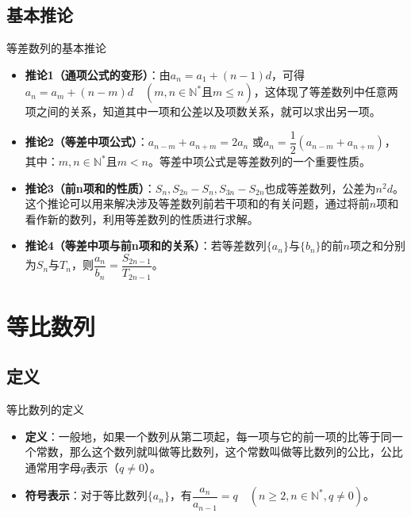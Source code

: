 \documentclass[aspectratio=169]{ctexbeamer} %
\begin{document}
\subsection{基本推论}
\begin{frame}{等差数列的基本推论}
\begin{itemize}
\item \textbf{推论1（通项公式的变形）}：由$a_n = a_1 + (n - 1)d$，可得$a_n = a_m + (n - m)d\quad(m, n \in \mathbb{N}^* \text{且} m \leq n)$，这体现了等差数列中任意两项之间的关系，知道其中一项和公差以及项数关系，就可以求出另一项。
\item \textbf{推论2（等差中项公式）}：$a_{n-m} + a_{n+m} = 2a_n$ 或$a_n = \dfrac{1}{2}(a_{n-m} + a_{n+m})$，其中：$m, n \in \mathbb{N}^* \text{且} m < n$。等差中项公式是等差数列的一个重要性质。
\item \textbf{推论3（前n项和的性质）}：$S_n, S_{2n} - S_n, S_{3n} - S_{2n}$也成等差数列，公差为$n^2 d$。这个推论可以用来解决涉及等差数列前若干项和的有关问题，通过将前$n$项和看作新的数列，利用等差数列的性质进行求解。
\item \textbf{推论4（等差中项与前n项和的关系）}：若等差数列$\{a_n\}$与$\{b_n\}$的前$n$项之和分别为$S_n$与$T_n$，则$\dfrac{a_n}{b_n} =\dfrac{S_{2n-1}}{T_{2n-1}}$。
\end{itemize}
\end{frame}

\section{等比数列}
\subsection{定义}
\begin{frame}{等比数列的定义}
\begin{itemize}
\item \textbf{定义}：一般地，如果一个数列从第二项起，每一项与它的前一项的比等于同一个常数，那么这个数列就叫做等比数列，这个常数叫做等比数列的公比，公比通常用字母$q$表示（$q \neq 0$）。
\item \textbf{符号表示}：对于等比数列$\{a_n\}$，有$\dfrac{a_n}{a_{n-1}} = q\quad(n \geq 2, n \in \mathbb{N}^*, q \neq 0)$。
\end{itemize}
\end{frame}
\end{document}
